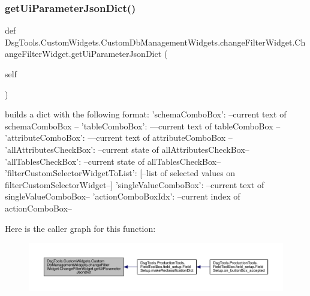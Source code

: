 \subsubsection{\texorpdfstring{get\+Ui\+Parameter\+Json\+Dict()}{getUiParameterJsonDict()}}
{\footnotesize\ttfamily def Dsg\+Tools.\+Custom\+Widgets.\+Custom\+Db\+Management\+Widgets.\+change\+Filter\+Widget.\+Change\+Filter\+Widget.\+get\+Ui\+Parameter\+Json\+Dict (\begin{DoxyParamCaption}\item[{}]{self }\end{DoxyParamCaption})}

\begin{DoxyVerb}builds a dict with the following format:
{
    'schemaComboBox': --current text of schemaComboBox --
    'tableComboBox': ---current text of tableComboBox --
    'attributeComboBox': ---current text of attributeComboBox --
    'allAttributesCheckBox': --current state of allAttributesCheckBox--
    'allTablesCheckBox': --current state of allTablesCheckBox--
    'filterCustomSelectorWidgetToList': [--list of selected values on filterCustomSelectorWidget--]
    'singleValueComboBox': --current text of singleValueComboBox--
    'actionComboBoxIdx': --current index of actionComboBox--
}
\end{DoxyVerb}
 Here is the caller graph for this function\+:
\nopagebreak
\begin{figure}[H]
\begin{center}
\leavevmode
\includegraphics[width=350pt]{class_dsg_tools_1_1_custom_widgets_1_1_custom_db_management_widgets_1_1change_filter_widget_1_1_change_filter_widget_a74d4e9ae39e5d8c3c8627180977ef9f7_icgraph}
\end{center}
\end{figure}
\mbox{\label{class_dsg_tools_1_1_custom_widgets_1_1_custom_db_management_widgets_1_1change_filter_widget_1_1_change_filter_widget_a05e71bee08fa2f3dcc25546f6feaf891}} 
